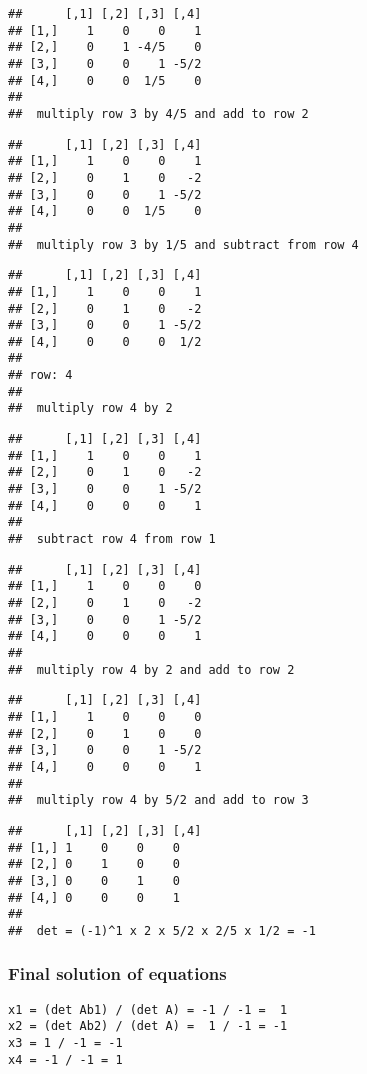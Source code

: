 \documentclass[
  10pt,
  a4paper,
]{article}
\begin{document}
\begin{verbatim}
##      [,1] [,2] [,3] [,4]
## [1,]    1    0    0    1
## [2,]    0    1 -4/5    0
## [3,]    0    0    1 -5/2
## [4,]    0    0  1/5    0
## 
##  multiply row 3 by 4/5 and add to row 2
\end{verbatim}

\begin{verbatim}
##      [,1] [,2] [,3] [,4]
## [1,]    1    0    0    1
## [2,]    0    1    0   -2
## [3,]    0    0    1 -5/2
## [4,]    0    0  1/5    0
## 
##  multiply row 3 by 1/5 and subtract from row 4
\end{verbatim}

\begin{verbatim}
##      [,1] [,2] [,3] [,4]
## [1,]    1    0    0    1
## [2,]    0    1    0   -2
## [3,]    0    0    1 -5/2
## [4,]    0    0    0  1/2
## 
## row: 4 
## 
##  multiply row 4 by 2
\end{verbatim}

\begin{verbatim}
##      [,1] [,2] [,3] [,4]
## [1,]    1    0    0    1
## [2,]    0    1    0   -2
## [3,]    0    0    1 -5/2
## [4,]    0    0    0    1
## 
##  subtract row 4 from row 1
\end{verbatim}

\begin{verbatim}
##      [,1] [,2] [,3] [,4]
## [1,]    1    0    0    0
## [2,]    0    1    0   -2
## [3,]    0    0    1 -5/2
## [4,]    0    0    0    1
## 
##  multiply row 4 by 2 and add to row 2
\end{verbatim}

\begin{verbatim}
##      [,1] [,2] [,3] [,4]
## [1,]    1    0    0    0
## [2,]    0    1    0    0
## [3,]    0    0    1 -5/2
## [4,]    0    0    0    1
## 
##  multiply row 4 by 5/2 and add to row 3
\end{verbatim}

\begin{verbatim}
##      [,1] [,2] [,3] [,4]
## [1,] 1    0    0    0   
## [2,] 0    1    0    0   
## [3,] 0    0    1    0   
## [4,] 0    0    0    1   
## 
##  det = (-1)^1 x 2 x 5/2 x 2/5 x 1/2 = -1
\end{verbatim}

\hypertarget{final-solution-of-equations}{%
\subsubsection{Final solution of
equations}\label{final-solution-of-equations}}

\begin{verbatim}
x1 = (det Ab1) / (det A) = -1 / -1 =  1
x2 = (det Ab2) / (det A) =  1 / -1 = -1
x3 = 1 / -1 = -1
x4 = -1 / -1 = 1
\end{verbatim}
\end{document}
